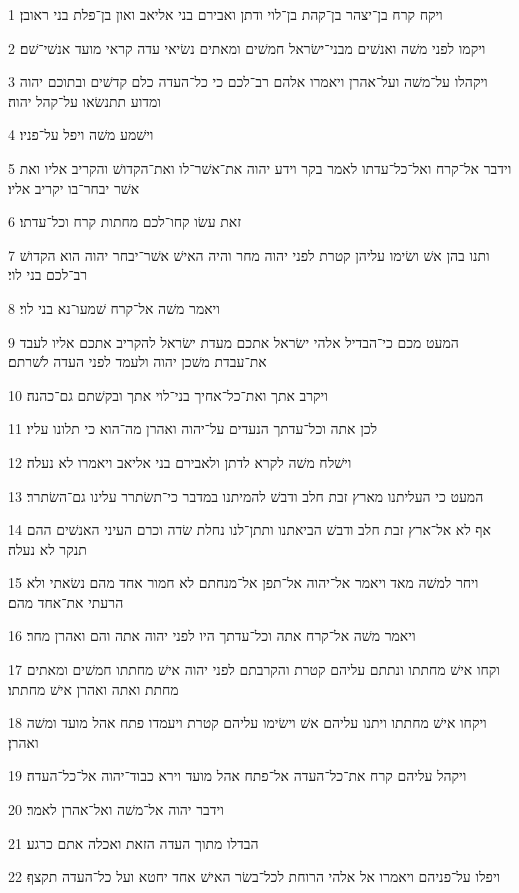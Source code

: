 \par 1 ויקח קרח בן־יצהר בן־קהת בן־לוי ודתן ואבירם בני אליאב ואון בן־פלת בני ראובן׃
\par 2 ויקמו לפני משׁה ואנשׁים מבני־ישׂראל חמשׁים ומאתים נשׂיאי עדה קראי מועד אנשׁי־שׁם׃
\par 3 ויקהלו על־משׁה ועל־אהרן ויאמרו אלהם רב־לכם כי כל־העדה כלם קדשׁים ובתוכם יהוה ומדוע תתנשׂאו על־קהל יהוה׃
\par 4 וישׁמע משׁה ויפל על־פניו׃
\par 5 וידבר אל־קרח ואל־כל־עדתו לאמר בקר וידע יהוה את־אשׁר־לו ואת־הקדושׁ והקריב אליו ואת אשׁר יבחר־בו יקריב אליו׃
\par 6 זאת עשׂו קחו־לכם מחתות קרח וכל־עדתו׃
\par 7 ותנו בהן אשׁ ושׂימו עליהן קטרת לפני יהוה מחר והיה האישׁ אשׁר־יבחר יהוה הוא הקדושׁ רב־לכם בני לוי׃
\par 8 ויאמר משׁה אל־קרח שׁמעו־נא בני לוי׃
\par 9 המעט מכם כי־הבדיל אלהי ישׂראל אתכם מעדת ישׂראל להקריב אתכם אליו לעבד את־עבדת משׁכן יהוה ולעמד לפני העדה לשׁרתם׃
\par 10 ויקרב אתך ואת־כל־אחיך בני־לוי אתך ובקשׁתם גם־כהנה׃
\par 11 לכן אתה וכל־עדתך הנעדים על־יהוה ואהרן מה־הוא כי תלונו עליו׃
\par 12 וישׁלח משׁה לקרא לדתן ולאבירם בני אליאב ויאמרו לא נעלה׃
\par 13 המעט כי העליתנו מארץ זבת חלב ודבשׁ להמיתנו במדבר כי־תשׂתרר עלינו גם־השׂתרר׃
\par 14 אף לא אל־ארץ זבת חלב ודבשׁ הביאתנו ותתן־לנו נחלת שׂדה וכרם העיני האנשׁים ההם תנקר לא נעלה׃
\par 15 ויחר למשׁה מאד ויאמר אל־יהוה אל־תפן אל־מנחתם לא חמור אחד מהם נשׂאתי ולא הרעתי את־אחד מהם׃
\par 16 ויאמר משׁה אל־קרח אתה וכל־עדתך היו לפני יהוה אתה והם ואהרן מחר׃
\par 17 וקחו אישׁ מחתתו ונתתם עליהם קטרת והקרבתם לפני יהוה אישׁ מחתתו חמשׁים ומאתים מחתת ואתה ואהרן אישׁ מחתתו׃
\par 18 ויקחו אישׁ מחתתו ויתנו עליהם אשׁ וישׂימו עליהם קטרת ויעמדו פתח אהל מועד ומשׁה ואהרן׃
\par 19 ויקהל עליהם קרח את־כל־העדה אל־פתח אהל מועד וירא כבוד־יהוה אל־כל־העדה׃
\par 20 וידבר יהוה אל־משׁה ואל־אהרן לאמר׃
\par 21 הבדלו מתוך העדה הזאת ואכלה אתם כרגע׃
\par 22 ויפלו על־פניהם ויאמרו אל אלהי הרוחת לכל־בשׂר האישׁ אחד יחטא ועל כל־העדה תקצף׃
